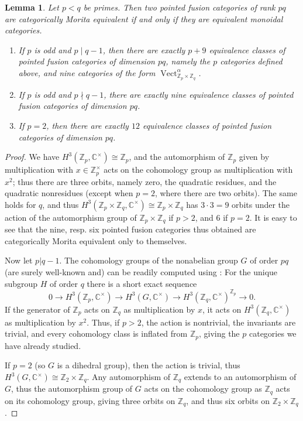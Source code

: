 \documentclass[12pt]{amsart}
\newtheorem{Lem}[Thm]{Lemma}
\theoremstyle{remark}
\theoremstyle{definition}
\numberwithin{equation}{section}
\newcommand\Vect{\operatorname{Vect}}
\newcommand\CC{\mathbb C}
\newcommand\ZZ{\mathbb Z}
\begin{document}
\begin{Lem}
  Let $p<q$ be primes. Then two pointed fusion categories of rank $pq$ are categorically Morita equivalent if and only if they are equivalent monoidal categories.
  \begin{enumerate}
  \item If $p$ is odd and $p\mid q-1$, then there are exactly $p+9$ equivalence classes of pointed fusion categories of dimension $pq$, namely the $p$ categories defined above, and nine categories of the form $\Vect_{\ZZ_p\times\ZZ_q}^\alpha$.
  \item If $p$ is odd and $p\nmid q-1$, there are exactly nine equivalence classes of pointed fusion categories of dimension $pq$.
  \item If $p=2$, then there are exactly $12$ equivalence classes of pointed fusion categories of dimension $pq$.
  \end{enumerate}
\end{Lem}
\begin{proof}
  We have $H^3(\ZZ_p,\CC^\times)\cong\ZZ_p$, and the automorphism of $\ZZ_p$ given by multiplication with $x\in\ZZ_p^\times$ acts on the cohomology group as multiplication with $x^2$; thus there are three orbits, namely zero, the quadratic residues, and the quadratic nonresidues (except when $p=2$, where there are two orbits). The same holds for $q$, and thus $H^3(\ZZ_p\times\ZZ_q,\CC^\times)\cong \ZZ_p\times\ZZ_q$ has $3\cdot 3=9$ orbits under the action of the automorphism group of $\ZZ_p\times\ZZ_q$ if $p>2$, and $6$ if $p=2$. It is easy to see that the nine, resp. six pointed fusion categories thus obtained are categorically Morita equivalent only to themselves.
 
 Now let $p|q-1$. The cohomology groups of the nonabelian group $G$ of order $pq$ (are surely well-known and) can be readily computed using \cite[Cor.10.8]{MR1344215}: For the unique subgroup $H$ of order $q$ there is a short exact sequence
  \begin{equation*}
    0\rightarrow H^3(\ZZ_p,\CC^\times)\to H^3(G,\CC^\times)\to H^3(\ZZ_q,\CC^\times)^{\ZZ_p}\to 0.
  \end{equation*}
If the generator of $\ZZ_p$ acts on $\ZZ_q$ as multiplication by $x$, it acts on $H^3(\ZZ_q,\CC^\times)$ as multiplication by $x^2$. Thus, if $p>2$,  the action is nontrivial,  the invariants are trivial, and every cohomology class is inflated from $\ZZ_p$, giving the $p$ categories we have already studied. 

If $p=2$ (so $G$ is a dihedral group), then the action is trivial, thus $H^3(G,\CC^\times)\cong \ZZ_2\times\ZZ_q$. Any automorphism of $\ZZ_q$ extends to an automorphism of $G$, thus the automorphism group of $G$ acts on the cohomology group as $\ZZ_q$ acts on its cohomology group, giving three orbits on $\ZZ_q$, and thus six orbits on $\ZZ_2\times\ZZ_q$.
\end{proof}
\end{document}
